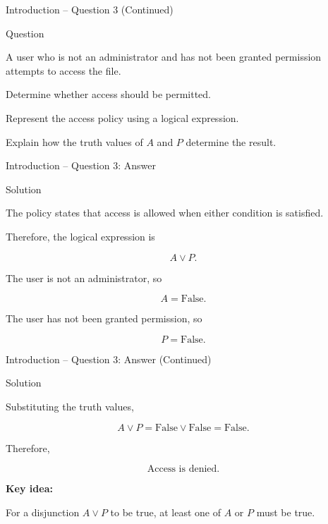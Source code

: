 \begin{frame}{Introduction -- Question 3 (Continued)}

\begin{block}{Question}

A user who is not an administrator and has not been granted permission
attempts to access the file.

\medskip

Determine whether access should be permitted.

\medskip

Represent the access policy using a logical expression.

\medskip

Explain how the truth values of $A$ and $P$ determine the result.

\end{block}

\end{frame}


\begin{frame}{Introduction -- Question 3: Answer}

\begin{exampleblock}{Solution}

The policy states that access is allowed when either condition is satisfied.

Therefore, the logical expression is

\[
\boxed{A\lor P}.
\]

The user is not an administrator, so

\[
A=\mathrm{False}.
\]

The user has not been granted permission, so

\[
P=\mathrm{False}.
\]

\end{exampleblock}

\end{frame}


\begin{frame}{Introduction -- Question 3: Answer (Continued)}

\begin{exampleblock}{Solution}

Substituting the truth values,

\[
A\lor P
=
\mathrm{False}\lor\mathrm{False}
=
\mathrm{False}.
\]

Therefore,

\[
\boxed{\text{Access is denied.}}
\]

\medskip

\textbf{Key idea:}

For a disjunction $A\lor P$ to be true, at least one of $A$ or $P$
must be true.

\end{exampleblock}

\end{frame}

